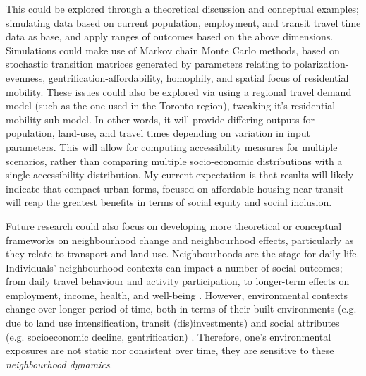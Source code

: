 This could be explored through a theoretical discussion and conceptual examples; simulating data based on current population, employment, and transit travel time data as base, and apply ranges of outcomes based on the above dimensions. Simulations could make use of Markov chain Monte Carlo methods, based on stochastic transition matrices generated by parameters relating to polarization-evenness, gentrification-affordability, homophily, and spatial focus of residential mobility. These issues could also be explored via using a regional travel demand model (such as the one used in the Toronto region), tweaking it's residential mobility sub-model.  In other words, it will provide differing outputs for population, land-use, and travel times depending on variation in input parameters. This will allow for computing accessibility measures for multiple scenarios, rather than comparing multiple socio-economic distributions with a single accessibility distribution. My current expectation is that results will likely indicate that compact urban forms, focused on affordable housing near transit will reap the greatest benefits in terms of social equity and social inclusion.

Future research could also focus on developing more theoretical or conceptual frameworks on neighbourhood change and neighbourhood effects, particularly as they relate to transport and land use. Neighbourhoods are the stage for daily life. Individuals' neighbourhood contexts can impact a number of social outcomes; from daily travel behaviour and activity participation, to longer-term effects on employment, income, health, and well-being \cite{sampson_assessing_2002,ewing_travel_2010,lucas_transport_2012,bastiaanssen_does_2020}. However, environmental contexts change over longer period of time, both in terms of their built environments (e.g. due to land use intensification, transit (dis)investments) and social attributes (e.g. socioeconomic decline, gentrification) \cite{van_ham_understanding_2013,wegener_land-use_2004}. Therefore, one's environmental exposures are not static nor consistent over time, they are sensitive to these \textit{neighbourhood dynamics}. 

